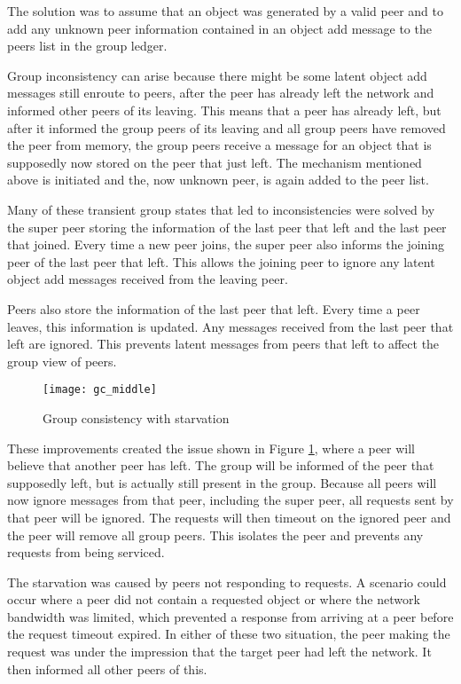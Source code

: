 The solution was to assume that an object was generated by a valid peer and to add any unknown peer information contained in an object add message to the peers list in the group ledger.

Group inconsistency can arise because there might be some latent object add messages still enroute to peers, after the peer has already left the network and informed other peers of its leaving. This means that a peer has already left, but after it informed the group peers of its leaving and all group peers have removed the peer from memory, the group peers receive a message for an object that is supposedly now stored on the peer that just left. The mechanism mentioned above is initiated and the, now unknown peer, is again added to the peer list.

Many of these transient group states that led to inconsistencies were solved by the super peer storing the information of the last peer that left and the last peer that joined. Every time a new peer joins, the super peer also informs the joining peer of the last peer that left. This allows the joining peer to ignore any latent object add messages received from the leaving peer.

Peers also store the information of the last peer that left. Every time a peer leaves, this information is updated. Any messages received from the last peer that left are ignored. This prevents latent messages from peers that left to affect the group view of peers.

\begin{figure}[htbp]
 \centering
 \texttt{[image: gc\_middle]}
 \caption{Group consistency with starvation}
 \label{fig_gc_middle}
\end{figure}
%
These improvements created the issue shown in Figure \ref{fig_gc_middle}, where a peer will believe that another peer has left. The group will be informed of the peer that supposedly left, but is actually still present in the group. Because all peers will now ignore messages from that peer, including the super peer, all requests sent by that peer will be ignored. The requests will then timeout on the ignored peer and the peer will remove all group peers. This isolates the peer and prevents any requests from being serviced.

The starvation was caused by peers not responding to requests. A scenario could occur where a peer did not contain a requested object or where the network bandwidth was limited, which prevented a response from arriving at a peer before the request timeout expired. In either of these two situation, the peer making the request was under the impression that the target peer had left the network. It then informed all other peers of this.

